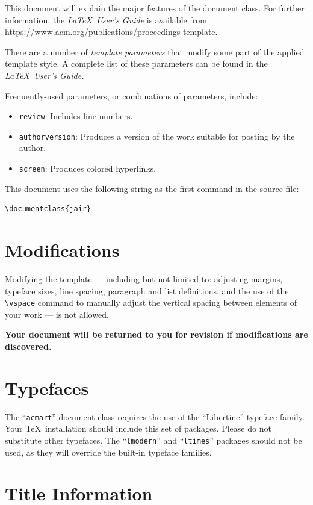 \documentclass[manuscript, screen, review]{jair}
\begin{document}
This document will explain the major features of the document
class. For further information, the {\itshape \LaTeX\ User's Guide} is
available from
\url{https://www.acm.org/publications/proceedings-template}.

There are a number of {\itshape template parameters}
that modify some part of the applied template style. A complete list
of these parameters can be found in the {\itshape \LaTeX\ User's Guide.}

Frequently-used parameters, or combinations of parameters, include:
\begin{itemize}
\item {\texttt{review}}: Includes line
  numbers.
\item{\texttt{authorversion}}: Produces a version of the work suitable
  for posting by the author.
\item{\texttt{screen}}: Produces colored hyperlinks.
\end{itemize}

This document uses the following string as the first command in the
source file:
\begin{verbatim}
\documentclass{jair}
\end{verbatim}

\section{Modifications}

Modifying the template --- including but not limited to: adjusting
margins, typeface sizes, line spacing, paragraph and list definitions,
and the use of the \verb|\vspace| command to manually adjust the
vertical spacing between elements of your work --- is not allowed.

{\bfseries Your document will be returned to you for revision if
  modifications are discovered.}

\section{Typefaces}

The ``\verb|acmart|'' document class requires the use of the
``Libertine'' typeface family. Your \TeX\ installation should include
this set of packages. Please do not substitute other typefaces. The
``\verb|lmodern|'' and ``\verb|ltimes|'' packages should not be used,
as they will override the built-in typeface families.

\section{Title Information}
\end{document}
